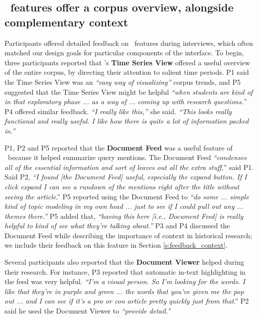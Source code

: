 \subsection{\ours~features offer a corpus overview, alongside complementary context}\label{s:features_feedback}

Participants offered detailed feedback on \ours~features during interviews, which often matched our design goals for particular components of the interface.
To begin, three participants reported that \ours's \textbf{Time Series View} offered a useful overview of the entire corpus, by directing their attention to salient time periods. 
P1 said the Time Series View was an \textit{``easy way of visualizing''} corpus trends, and P5 suggested that the Time Series View might be helpful \textit{``when students are kind of in that exploratory phase ... as a way of ... coming up with research questions.''}
P4 offered similar feedback. 
\textit{``I really like this,''} she said. \textit{``This looks really functional and really useful. I like how there is quite a lot of information packed in.''} 

P1, P2 and P5 reported that the \textbf{Document Feed} was a useful feature of \ours~because it helped summarize query mentions. The Document Feed \textit{``condenses all of the essential information and sort of leaves out all the extra stuff},'' said P1. Said P2, \textit{``I found [the Document Feed] useful, especially the expand button. If I click expand I can see a rundown of the mentions right after the title without seeing the article}.'' 
P5 reported using the Document Feed to \textit{``do some ... simple kind of topic modeling in my own head ... just to see if I could pull out any ... themes there.''}
P5 added that, \textit{``having this here [i.e., Document Feed] is really helpful to kind of see what they're talking about.''}
P3 and P4 discussed the Document Feed while describing the importance of context in historical research; we include their feedback on this feature in Section \ref{s:feedback_context}. 

Several participants also reported that the \textbf{Document Viewer} helped during their research. For instance, P3 reported that automatic in-text highlighting in the feed was very helpful. \textit{``I'm a visual person. So I'm looking for the words. I like that they're in purple and green ... the words that you've given me the pop out ... and I can see if it's a pro or con article pretty quickly just from that}.'' P2 said he used the Document Viewer to \textit{``provide detail.''}

